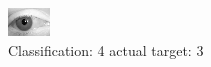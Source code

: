 \begin{figure}[h!]
\begin{center}
\includegraphics[width=0.60\columnwidth]{figures/ID2808_class_4_target_3.png}
\end{center}
\caption{ Classification: 4 actual target: 3}
\label{fig:ID2808_class_4_target_3}
\end{figure}
